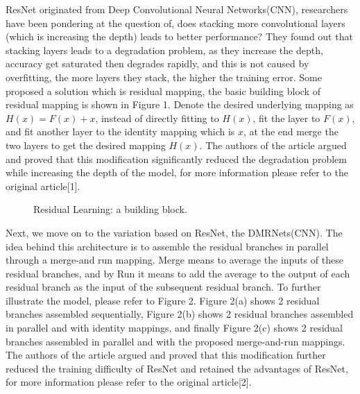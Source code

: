 \documentclass{article}
\begin{document}
ResNet originated from Deep Convolutional Neural Networks(CNN), researchers have been pondering at the question of, does stacking more convolutional layers (which is increasing the depth) leads to better performance? They found out that stacking layers leads to a degradation problem, as they increase the depth, accuracy get saturated then degrades rapidly, and this is not caused by overfitting, the more layers they stack, the higher the training error. Some proposed a solution which is residual mapping, the basic building block of residual mapping is shown in Figure 1. Denote the desired underlying mapping as $H(x) = F(x) + x$, instead of directly fitting to $H(x)$, fit the layer to $F(x)$, and fit another layer to the identity mapping which is $x$, at the end merge the two layers to get the desired mapping $H(x)$. The authors of the article argued and proved that this modification significantly reduced the degradation problem while increasing the depth of the model, for more information please refer to the original article[1].

\begin{figure} [H]
  \centering
  \caption{Residual Learning: a building block.}
\end{figure}

Next, we move on to the variation based on ResNet, the DMRNets(CNN). The idea behind this architecture is to assemble the residual branches in parallel through a merge-and run mapping. Merge means to average the inputs of these residual branches, and by Run it means to add the average to the output of each residual branch as the input of the subsequent residual branch.
To further illustrate the model, please refer to Figure 2. Figure 2(a) shows 2 residual branches assembled sequentially, Figure 2(b) shows 2 residual branches assembled in parallel and with identity mappings, and finally Figure 2(c) shows 2 residual branches assembled in parallel and with the proposed merge-and-run mappings. The authors of the article argued and proved that this modification further reduced the training difficulty of ResNet and retained the advantages of ResNet, for more information please refer to the original article[2].
\end{document}
